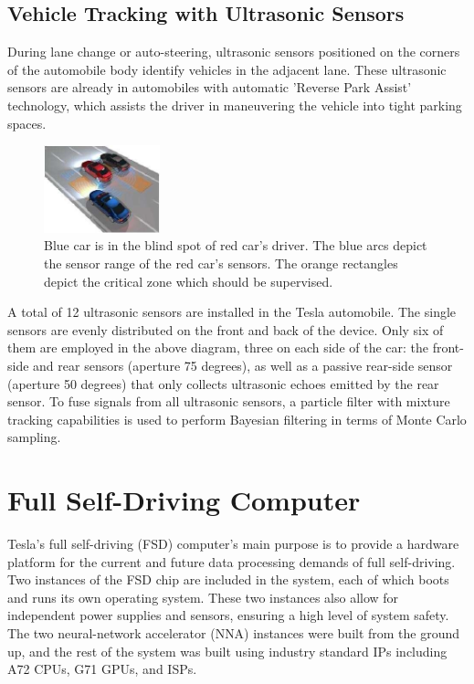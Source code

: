 \documentclass[letterpaper, 10 pt, conference]{ieeeconf}  %
\begin{document}
\subsection{Vehicle Tracking with Ultrasonic Sensors}

During lane change or auto-steering, ultrasonic sensors positioned on the corners of the automobile body identify vehicles in the adjacent lane. These ultrasonic sensors are already in automobiles with automatic 'Reverse Park Assist' technology, which assists the driver in maneuvering the vehicle into tight parking spaces. 

\begin{figure}[hbt!]
\centering
\includegraphics[width=0.3\textwidth]{gfx/Ultrasonic.jpg}
\caption{Blue car is in the blind spot of red car’s driver.
The blue arcs depict the sensor range of the red car’s
sensors. The orange rectangles depict the critical zone
which should be supervised.}
\end{figure}


A total of 12 ultrasonic sensors are installed in the Tesla automobile. The single sensors are evenly distributed on the front and back of the device. Only six of them are employed in the above diagram, three on each side of the car: the front-side and rear sensors (aperture 75 degrees), as well as a passive rear-side sensor (aperture 50 degrees) that only collects ultrasonic echoes emitted by the rear sensor. To fuse signals from all ultrasonic sensors, a particle filter with mixture tracking capabilities is used to perform Bayesian filtering in terms of Monte Carlo sampling\cite{wiki_autopilot}.


\section{Full Self-Driving Computer}

Tesla's full self-driving (FSD) computer's main purpose is to provide a hardware platform for the current and future data processing demands of full self-driving. Two instances of the FSD chip are included in the system, each of which boots and runs its own operating system. These two instances also allow for independent power supplies and sensors, ensuring a high level of system safety\cite{fsd_computer}. The two neural-network accelerator (NNA) instances were built from the ground up, and the rest of the system was built using industry standard IPs including A72 CPUs, G71 GPUs, and ISPs.
\end{document}
